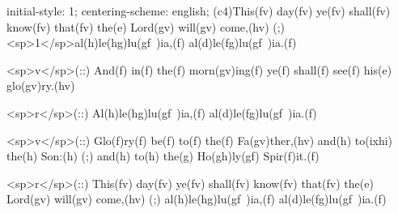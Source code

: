 initial-style: 1;
centering-scheme: english;
(c4)This(fv) day(fv) ye(fv) shall(fv) know(fv) that(fv) the(e) Lord(gv) will(gv) come,(hv) (;) <sp>1</sp>al(h)le(hg)lu(gf~)ia,(f) al(d)le(fg)lu(gf~)ia.(f) 

<sp>v</sp>(::) And(f) in(f) the(f) morn(gv)ing(f) ye(f) shall(f) see(f) his(e) glo(gv)ry.(hv)

<sp>r</sp>(::) Al(h)le(hg)lu(gf~)ia,(f) al(d)le(fg)lu(gf~)ia.(f) 

<sp>v</sp>(::) Glo(f)ry(f) be(f) to(f) the(f) Fa(gv)ther,(hv) and(h) to(ixhi) the(h) Son:(h) (;) and(h) to(h) the(g) Ho(gh)ly(gf) Spir(f)it.(f)

<sp>r</sp>(::) This(fv) day(fv) ye(fv) shall(fv) know(fv) that(fv) the(e) Lord(gv) will(gv) come,(hv) (;) al(h)le(hg)lu(gf~)ia,(f) al(d)le(fg)lu(gf~)ia.(f) 